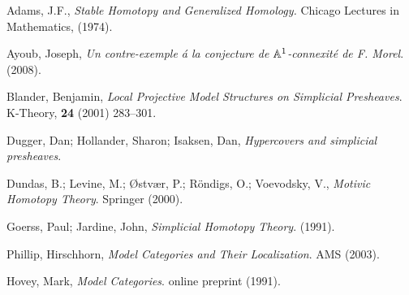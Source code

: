 \documentclass{amsart}%
\begin{document}
\begin{thebibliography}{OOOO}
     Adams, J.F., {\it Stable Homotopy and
    Generalized Homology.} Chicago Lectures in Mathematics, (1974).

     Ayoub, Joseph, {\it Un contre-exemple {\'a}
    la conjecture de $\mathbb{A}^1$-connexit{\'e} de F.  Morel}. (2008).


     Blander, Benjamin, {\it Local Projective
    Model Structures on Simplicial Presheaves}. K-Theory, {\bf 24}
  (2001) 283--301.



     Dugger, Dan; Hollander, Sharon; Isaksen, Dan,
  {\it Hypercovers and simplicial presheaves}.

     Dundas, B.; Levine, M.;
  {\O}stv{\ae}r, P.; R\"ondigs, O.; Voevodsky, V., {\it Motivic
    Homotopy Theory}. Springer (2000).





     Goerss, Paul; Jardine, John, {\it Simplicial
    Homotopy Theory}. (1991).

     Phillip, Hirschhorn, {\it Model Categories
    and Their Localization}. AMS (2003).

     Hovey, Mark, {\it Model Categories}.
  online preprint (1991).
  

\end{thebibliography}
\end{document}
